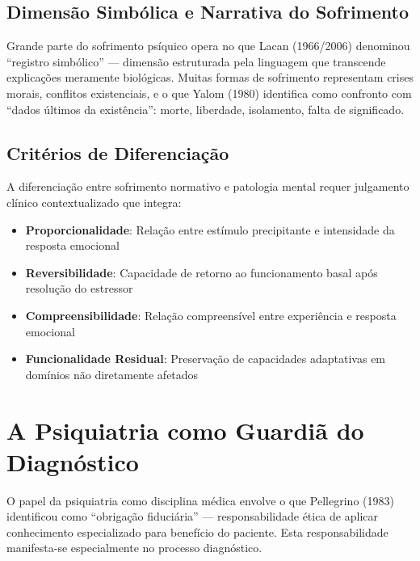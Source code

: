 \subsection{Dimensão Simbólica e Narrativa do Sofrimento}

Grande parte do sofrimento psíquico opera no que Lacan (1966/2006) denominou \enquote{registro simbólico} --- dimensão estruturada pela linguagem que transcende explicações meramente biológicas. Muitas formas de sofrimento representam crises morais, conflitos existenciais, e o que Yalom (1980) identifica como confronto com \enquote{dados últimos da existência}: morte, liberdade, isolamento, falta de significado.

\subsection{Critérios de Diferenciação}

A diferenciação entre sofrimento normativo e patologia mental requer julgamento clínico contextualizado que integra:

\begin{itemize}
\item \textbf{Proporcionalidade}: Relação entre estímulo precipitante e intensidade da resposta emocional
\item \textbf{Reversibilidade}: Capacidade de retorno ao funcionamento basal após resolução do estressor
\item \textbf{Compreensibilidade}: Relação compreensível entre experiência e resposta emocional
\item \textbf{Funcionalidade Residual}: Preservação de capacidades adaptativas em domínios não diretamente afetados
\end{itemize}

\section{A Psiquiatria como Guardiã do Diagnóstico}
\label{sec:guardia-diagnostico}

O papel da psiquiatria como disciplina médica envolve o que Pellegrino (1983) identificou como \enquote{obrigação fiduciária} --- responsabilidade ética de aplicar conhecimento especializado para benefício do paciente. Esta responsabilidade manifesta-se especialmente no processo diagnóstico.

